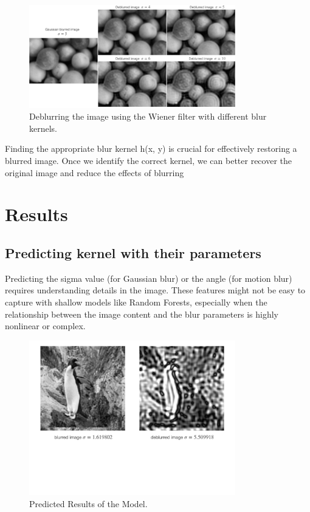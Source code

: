 \documentclass[twoside,11pt]{article}
\begin{document}
\begin{figure}[!ht]
\centering
\includegraphics[width=0.8\textwidth]{figure7.png}
\caption{Deblurring the image using the Wiener filter with different blur kernels.}
\end{figure}
Finding the appropriate blur kernel  h(x, y)  is crucial for effectively restoring a blurred image. Once we identify the correct kernel, we can better recover the original image and reduce the effects of blurring

\FloatBarrier 

\section{Results}
\subsection{Predicting kernel with their parameters}
Predicting the sigma value (for Gaussian blur) or the angle (for motion blur) requires understanding details in the image. These features might not be easy to capture with shallow models like Random Forests, especially when the relationship between the image content and the blur parameters is highly nonlinear or complex. 

\begin{figure}[H]
\centering
\includegraphics[width=0.8\textwidth]{figure8.png}
\caption{Predicted Results of the Model.}
\end{figure}
\end{document}
